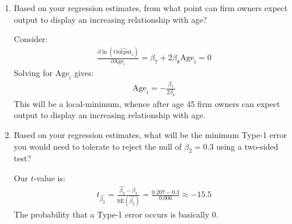\documentclass[11pt,twoside,openany]{memoir}
\begin{document}
\begin{question}
\begin{enumerate}[label = (\alph*),itemsep=1pt,topsep=3pt]
            \item Based on your regression estimates, from what point can firm owners expect output to display an increasing relationship with age?
                {\color{blue} \begin{solution}
                    Consider:
                        \begin{equation*}
                        \begin{split}
                            \frac{\partial \ln(\widehat{\text{Output}_i})}{\partial \text{Age}_i} = \beta_7 + 2\beta_8 \text{Age}_i = 0
                        \end{split}
                        \end{equation*}
                        Solving for $\text{Age}_i$ gives:
                            \begin{equation*}
                            \begin{split}
                                \text{Age}_i = -\frac{\beta_7}{2\beta_8}
                            \end{split}
                            \end{equation*}
                        This will be a local-minimum, whence after age 45 firm owners can expect output to display an increasing relationship with age.
                \end{solution}}

            \item Based on your regression estimates, what will be the minimum Type-1 error you would need to tolerate to reject the null of $\beta_2 = 0.3$ using a two-sided test?
                {\color{blue} \begin{solution}
                    Our $t$-value is:
                        \begin{equation*}
                        \begin{split}
                            t_{\widehat{\beta_2}} = \frac{\widehat{\beta_2} - \beta_2}{\text{SE}(\widehat{\beta_2})} = \frac{0.207 - 0.3}{0.006} \approx -15.5
                        \end{split}
                        \end{equation*}
                    The probability that a Type-1 error occurs is basically 0.
                \end{solution}}
            

\end{enumerate}
\end{question}
\end{document}

